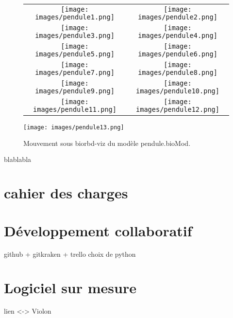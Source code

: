 \begin{figure}[H]
\begin{center}
\begin{tabular}{cc}

\texttt{[image: images/pendule1.png]} & \texttt{[image: images/pendule2.png]} \\
\texttt{[image: images/pendule3.png]} & \texttt{[image: images/pendule4.png]} \\
\texttt{[image: images/pendule5.png]} & \texttt{[image: images/pendule6.png]} \\
\texttt{[image: images/pendule7.png]} & \texttt{[image: images/pendule8.png]} \\
\texttt{[image: images/pendule9.png]} & \texttt{[image: images/pendule10.png]} \\
\texttt{[image: images/pendule11.png]} & \texttt{[image: images/pendule12.png]} \\
\end{tabular}
\end{center}
\end{figure}




\begin{figure}[h]
\begin{center}
\texttt{[image: images/pendule13.png]}
\caption{Mouvement sous biorbd-viz du modèle pendule.bioMod.}
\end{center}
\end{figure}
blablabla
\newpage

        \section{cahier des charges} %


        \section{Développement collaboratif}
github + gitkraken + trello
choix de python
        \section{Logiciel sur mesure}
lien <-> Violon

